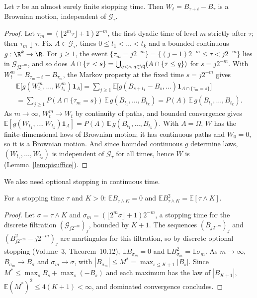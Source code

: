 \begin{theorem}\label{thm:strongmarkov}
Let $\tau$ be an almost surely finite stopping time. Then $W_t=B_{\tau+t}-B_\tau$ is a Brownian motion, independent of $\mathcal G_\tau$.
\end{theorem}
\begin{proof}
Let $\tau_m=(\lfloor2^m\tau\rfloor+1)2^{-m}$, the first dyadic time of level $m$ strictly after $\tau$; then $\tau_m\downarrow\tau$. Fix $A\in\mathcal G_\tau$, times
$0\le t_1<\dots<t_k$ and a bounded continuous $g:\R^k\to\R$. For $j\ge1$, the event $\{\tau_m=j2^{-m}\}=\{(j-1)2^{-m}\le\tau<j2^{-m}\}$ lies in
$\mathcal G_{j2^{-m}}$, and so does $A\cap\{\tau<s\}=\bigcup_{q<s,\,q\in\Q}(A\cap\{\tau\le q\})$ for $s=j2^{-m}$. With $W^m_t=B_{\tau_m+t}-B_{\tau_m}$, the Markov
property at the fixed time $s=j2^{-m}$ gives
\[
\begin{gathered}
\mathbb E\bigl[g(W^m_{t_1},\dots,W^m_{t_k})\mathbf 1_A\bigr]=\sum_{j\ge1}\mathbb E\bigl[g(B_{s+t_1}-B_s,\dots)\mathbf 1_{A\cap\{\tau_m=s\}}\bigr]\\
=\sum_{j\ge1}P(A\cap\{\tau_m=s\})\,\mathbb E\,g(B_{t_1},\dots,B_{t_k})=P(A)\,\mathbb E\,g(B_{t_1},\dots,B_{t_k}).
\end{gathered}
\]
As $m\to\infty$, $W^m_t\to W_t$ by continuity of paths, and bounded convergence gives $\mathbb E[g(W_{t_1},\dots,W_{t_k})\mathbf 1_A]=P(A)\,\mathbb E\,g(B_{t_1},\dots,B_{t_k})$.
With $A=\Omega$, $W$ has the finite-dimensional laws of Brownian motion; it has continuous paths and $W_0=0$, so it is a Brownian motion. And since bounded
continuous $g$ determine laws, $(W_{t_1},\dots,W_{t_k})$ is independent of $\mathcal G_\tau$ for all times, hence $W$ is (Lemma~\ref{lem:pisuffice}).
\end{proof}

We also need optional stopping in continuous time.

\begin{lemma}\label{lem:ostbm}
For a stopping time $\tau$ and $K>0$: $\mathbb E B_{\tau\wedge K}=0$ and $\mathbb E B_{\tau\wedge K}^2=\mathbb E[\tau\wedge K]$.
\end{lemma}
\begin{proof}
Let $\sigma=\tau\wedge K$ and $\sigma_m=(\lfloor2^m\sigma\rfloor+1)2^{-m}$, a stopping time for the discrete filtration $(\mathcal G_{j2^{-m}})_j$, bounded by $K+1$.
The sequences $(B_{j2^{-m}})_j$ and $(B_{j2^{-m}}^2-j2^{-m})_j$ are martingales for this filtration, so by discrete optional stopping (Volume~3, Theorem~10.12),
$\mathbb E B_{\sigma_m}=0$ and $\mathbb E B_{\sigma_m}^2=\mathbb E\sigma_m$. As $m\to\infty$, $B_{\sigma_m}\to B_\sigma$ and $\sigma_m\to\sigma$, with $|B_{\sigma_m}|\le M^*=\max_{s\le K+1}|B_s|$.
Since $M^*\le\max_sB_s+\max_s(-B_s)$ and each maximum has the law of $|B_{K+1}|$, $\mathbb E(M^*)^2\le4(K+1)<\infty$, and dominated convergence concludes.
\end{proof}

